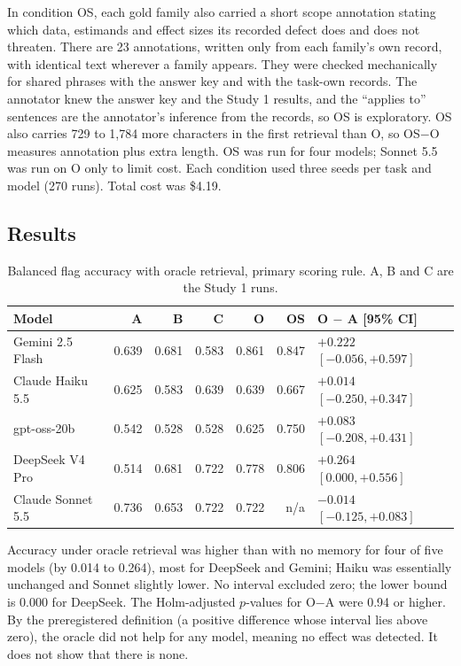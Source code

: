In condition OS, each gold family also carried a short scope annotation stating which data, estimands and effect sizes its recorded defect does and does not threaten. There are 23 annotations, written only from each family's own record, with identical text wherever a family appears. They were checked mechanically for shared phrases with the answer key and with the task-own records. The annotator knew the answer key and the Study 1 results, and the ``applies to'' sentences are the annotator's inference from the records, so OS is exploratory. OS also carries 729 to 1,784 more characters in the first retrieval than O, so OS$-$O measures annotation plus extra length. OS was run for four models; Sonnet 5.5 was run on O only to limit cost. Each condition used three seeds per task and model (270 runs). Total cost was \$4.19.

\subsection{Results}

\begin{table}[ht]
\centering
\caption{Balanced flag accuracy with oracle retrieval, primary scoring rule. A, B and C are the Study 1 runs.}
\label{tab:study1b}
\small
\begin{tabular}{lrrrrrl}
\toprule
Model & A & B & C & O & OS & O $-$ A [95\% CI] \\
\midrule
Gemini 2.5 Flash & 0.639 & 0.681 & 0.583 & 0.861 & 0.847 & $+0.222$ $[-0.056, +0.597]$ \\
Claude Haiku 5.5 & 0.625 & 0.583 & 0.639 & 0.639 & 0.667 & $+0.014$ $[-0.250, +0.347]$ \\
gpt-oss-20b & 0.542 & 0.528 & 0.528 & 0.625 & 0.750 & $+0.083$ $[-0.208, +0.431]$ \\
DeepSeek V4 Pro & 0.514 & 0.681 & 0.722 & 0.778 & 0.806 & $+0.264$ $[0.000, +0.556]$ \\
Claude Sonnet 5.5 & 0.736 & 0.653 & 0.722 & 0.722 & n/a & $-0.014$ $[-0.125, +0.083]$ \\
\bottomrule
\end{tabular}
\end{table}

Accuracy under oracle retrieval was higher than with no memory for four of five models (by 0.014 to 0.264), most for DeepSeek and Gemini; Haiku was essentially unchanged and Sonnet slightly lower. No interval excluded zero; the lower bound is 0.000 for DeepSeek. The Holm-adjusted $p$-values for O$-$A were 0.94 or higher. By the preregistered definition (a positive difference whose interval lies above zero), the oracle did not help for any model, meaning no effect was detected. It does not show that there is none.

